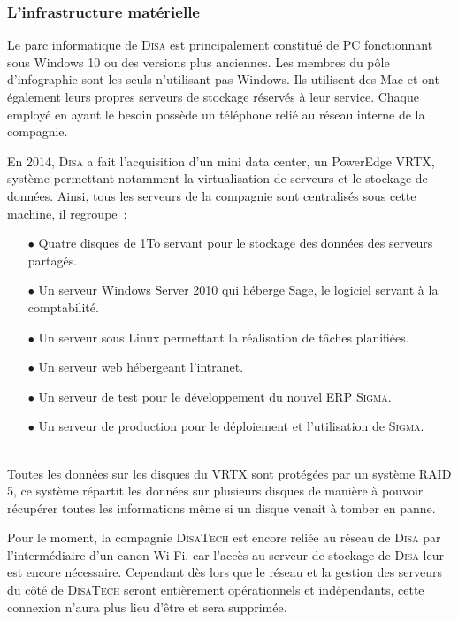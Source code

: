 \subsubsection{L’infrastructure matérielle}

Le parc informatique de \textsc{Disa} est principalement constitué de PC fonctionnant sous Windows 10 ou des versions plus anciennes.
Les membres du pôle d'infographie sont les seuls n'utilisant pas Windows.
Ils utilisent des Mac et ont également leurs propres serveurs de stockage réservés à leur service.
Chaque employé en ayant le besoin possède un téléphone relié au réseau interne de la compagnie.

En 2014, \textsc{Disa} a fait l'acquisition d'un mini data center, un PowerEdge VRTX, système permettant notamment la virtualisation de serveurs et le stockage de données.
Ainsi, tous les serveurs de la compagnie sont centralisés sous cette machine, il regroupe~:~
\\
\begin{itemize}
    \item[\tiny$\bullet$] Quatre disques de 1To servant pour le stockage des données des serveurs partagés.
    \item[\tiny$\bullet$] Un serveur Windows Server 2010 qui héberge Sage, le logiciel servant à la comptabilité.
    \item[\tiny$\bullet$] Un serveur sous Linux permettant la réalisation de tâches planifiées.
    \item[\tiny$\bullet$] Un serveur web hébergeant l'intranet.
    \item[\tiny$\bullet$] Un serveur de test pour le développement du nouvel ERP \textsc{Sigma}.
    \item[\tiny$\bullet$] Un serveur de production pour le déploiement et l'utilisation de \textsc{Sigma}.
\end{itemize}
~\\

Toutes les données sur les disques du VRTX sont protégées par un système RAID 5, ce système répartit les données sur plusieurs disques de manière à pouvoir récupérer toutes les informations même si un disque venait à tomber en panne.

Pour le moment, la compagnie \textsc{DisaTech} est encore reliée au réseau de \textsc{Disa} par l'intermédiaire d'un canon Wi-Fi, car l'accès au serveur de stockage de \textsc{Disa} leur est encore nécessaire.
Cependant dès lors que le réseau et la gestion des serveurs du côté de \textsc{DisaTech} seront entièrement opérationnels et indépendants, cette connexion n'aura plus lieu d'être et sera supprimée.

